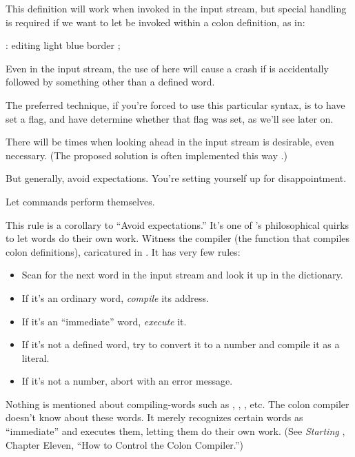 This definition will work when invoked in the input stream, but special
handling is required if we want to let  be invoked within a
colon definition, as in:
\begin{Code}
: editing   light blue border ;
\end{Code}
Even in the input stream, the use of  here will cause a
crash if  is accidentally followed by something other than a
defined word.

The preferred technique, if you're forced to use this particular
syntax, is to have  set a flag, and have 
determine whether that flag was set, as we'll see later on.

There will be times when looking ahead in the input stream is desirable,
even necessary. (The proposed  solution is often implemented
this way \cite{rosen82}.)

But generally, avoid expectations. You're setting yourself up for
disappointment.

\begin{tip}
Let commands perform themselves.
\end{tip}%
%
This rule is a corollary to ``Avoid expectations.'' It's one of
\Forth{}'s philosophical quirks to let words do their own work. Witness
the \Forth{} compiler (the function that compiles colon definitions),
caricatured in . It has very few rules:



\begin{itemize}
\item Scan for the next word in the input stream and look it up in the
dictionary.

\item If it's an ordinary word, \emph{compile} its address.

\item If it's an ``immediate'' word, \emph{execute} it.

\item If it's not a defined word, try to convert it to a number and
compile it as a literal.

\item If it's not a number, abort with an error message.
\end{itemize}
Nothing is mentioned about compiling-words such as ,
, , etc. The colon compiler doesn't know about
these words. It merely recognizes certain words as ``immediate'' and
executes them, letting them do their own work. (See \emph{Starting
\Forth{}}, Chapter Eleven, ``How to Control the Colon Compiler.'')

